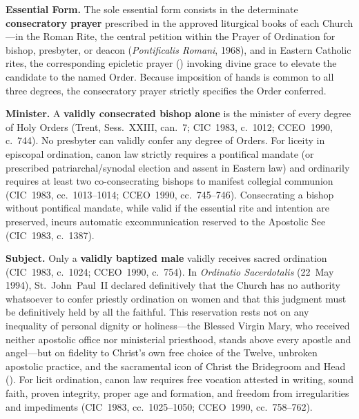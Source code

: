 \textbf{Essential Form.} The sole essential form consists in the determinate \textbf{consecratory prayer} prescribed in the approved liturgical books of each Church ---in the Roman Rite, the central petition within the Prayer of Ordination for bishop, presbyter, or deacon (\emph{Pontificalis Romani}, 1968), and in Eastern Catholic rites, the corresponding epicletic prayer () invoking divine grace to elevate the candidate to the named Order. Because imposition of hands is common to all three degrees, the consecratory prayer strictly specifies the Order conferred.

\textbf{Minister.} A \textbf{validly consecrated bishop alone} is the minister of every degree of Holy Orders (Trent, Sess.~XXIII, can.~7; CIC~1983, c.~1012; CCEO~1990, c.~744). No presbyter can validly confer any degree of Orders. For liceity in episcopal ordination, canon law strictly requires a pontifical mandate (or prescribed patriarchal/synodal election and assent in Eastern law) and ordinarily requires at least two co-consecrating bishops to manifest collegial communion (CIC~1983, cc.~1013--1014; CCEO~1990, cc.~745--746). Consecrating a bishop without pontifical mandate, while valid if the essential rite and intention are preserved, incurs automatic excommunication reserved to the Apostolic See (CIC~1983, c.~1387).

\textbf{Subject.} Only a \textbf{validly baptized male} validly receives sacred ordination (CIC~1983, c.~1024; CCEO~1990, c.~754). In \emph{Ordinatio Sacerdotalis} (22~May 1994), St.~John~Paul~II declared definitively that the Church has no authority whatsoever to confer priestly ordination on women and that this judgment must be definitively held by all the faithful. This reservation rests not on any inequality of personal dignity or holiness---the Blessed Virgin Mary, who received neither apostolic office nor ministerial priesthood, stands above every apostle and angel---but on fidelity to Christ's own free choice of the Twelve, unbroken apostolic practice, and the sacramental icon of Christ the Bridegroom and Head (). For licit ordination, canon law requires free vocation attested in writing, sound faith, proven integrity, proper age and formation, and freedom from irregularities and impediments (CIC~1983, cc.~1025--1050; CCEO~1990, cc.~758--762).

